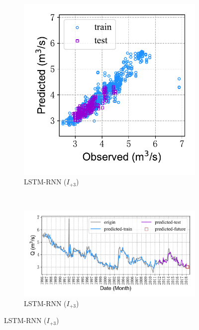 \begin{figure}[!htbp]
\begin{subfigure}[b]{0.615\textwidth}
  \end{subfigure}
  \\
  \begin{subfigure}[b]{0.305\textwidth}
    \includegraphics[width=\textwidth]{Img/chap4_spr/out3/spr_scatter_in_3_out_3_lstm.pdf}
    \vspace{-1.2cm}
    \caption{LSTM-RNN ($I_{+3}$)}
    \label{fig:spr_scatter_in_3_out_3_lstm}
  \end{subfigure}
  ~
  \begin{subfigure}[b]{0.615\textwidth}
    \includegraphics[width=\textwidth]{Img/chap4_spr/out3/spr_series_in_3_out_3_lstm.pdf}
    \vspace{-1.2cm}
    \caption{LSTM-RNN ($I_{+3}$)}

\end{subfigure}
\end{figure}
